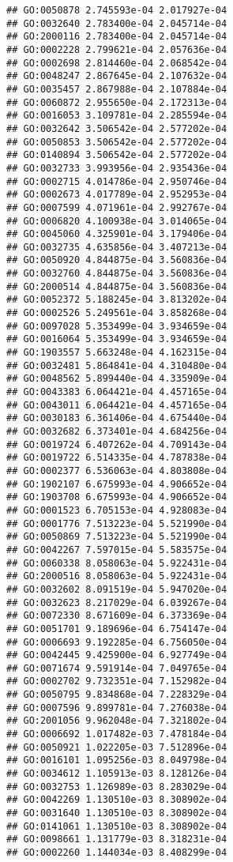 \documentclass[
]{article}
\begin{document}
\begin{verbatim}
## GO:0050878 2.745593e-04 2.017927e-04
## GO:0032640 2.783400e-04 2.045714e-04
## GO:2000116 2.783400e-04 2.045714e-04
## GO:0002228 2.799621e-04 2.057636e-04
## GO:0002698 2.814460e-04 2.068542e-04
## GO:0048247 2.867645e-04 2.107632e-04
## GO:0035457 2.867988e-04 2.107884e-04
## GO:0060872 2.955650e-04 2.172313e-04
## GO:0016053 3.109781e-04 2.285594e-04
## GO:0032642 3.506542e-04 2.577202e-04
## GO:0050853 3.506542e-04 2.577202e-04
## GO:0140894 3.506542e-04 2.577202e-04
## GO:0032733 3.993956e-04 2.935436e-04
## GO:0002715 4.014786e-04 2.950746e-04
## GO:0002673 4.017789e-04 2.952953e-04
## GO:0007599 4.071961e-04 2.992767e-04
## GO:0006820 4.100938e-04 3.014065e-04
## GO:0045060 4.325901e-04 3.179406e-04
## GO:0032735 4.635856e-04 3.407213e-04
## GO:0050920 4.844875e-04 3.560836e-04
## GO:0032760 4.844875e-04 3.560836e-04
## GO:2000514 4.844875e-04 3.560836e-04
## GO:0052372 5.188245e-04 3.813202e-04
## GO:0002526 5.249561e-04 3.858268e-04
## GO:0097028 5.353499e-04 3.934659e-04
## GO:0016064 5.353499e-04 3.934659e-04
## GO:1903557 5.663248e-04 4.162315e-04
## GO:0032481 5.864841e-04 4.310480e-04
## GO:0048562 5.899440e-04 4.335909e-04
## GO:0043383 6.064421e-04 4.457165e-04
## GO:0043011 6.064421e-04 4.457165e-04
## GO:0030183 6.361406e-04 4.675440e-04
## GO:0032682 6.373401e-04 4.684256e-04
## GO:0019724 6.407262e-04 4.709143e-04
## GO:0019722 6.514335e-04 4.787838e-04
## GO:0002377 6.536063e-04 4.803808e-04
## GO:1902107 6.675993e-04 4.906652e-04
## GO:1903708 6.675993e-04 4.906652e-04
## GO:0001523 6.705153e-04 4.928083e-04
## GO:0001776 7.513223e-04 5.521990e-04
## GO:0050869 7.513223e-04 5.521990e-04
## GO:0042267 7.597015e-04 5.583575e-04
## GO:0060338 8.058063e-04 5.922431e-04
## GO:2000516 8.058063e-04 5.922431e-04
## GO:0032602 8.091519e-04 5.947020e-04
## GO:0032623 8.217029e-04 6.039267e-04
## GO:0072330 8.671609e-04 6.373369e-04
## GO:0051701 9.189696e-04 6.754147e-04
## GO:0006693 9.192285e-04 6.756050e-04
## GO:0042445 9.425900e-04 6.927749e-04
## GO:0071674 9.591914e-04 7.049765e-04
## GO:0002702 9.732351e-04 7.152982e-04
## GO:0050795 9.834868e-04 7.228329e-04
## GO:0007596 9.899781e-04 7.276038e-04
## GO:2001056 9.962048e-04 7.321802e-04
## GO:0006692 1.017482e-03 7.478184e-04
## GO:0050921 1.022205e-03 7.512896e-04
## GO:0016101 1.095256e-03 8.049798e-04
## GO:0034612 1.105913e-03 8.128126e-04
## GO:0032753 1.126989e-03 8.283029e-04
## GO:0042269 1.130510e-03 8.308902e-04
## GO:0031640 1.130510e-03 8.308902e-04
## GO:0141061 1.130510e-03 8.308902e-04
## GO:0098661 1.131779e-03 8.318231e-04
## GO:0002260 1.144034e-03 8.408299e-04

\end{verbatim}
\end{document}

